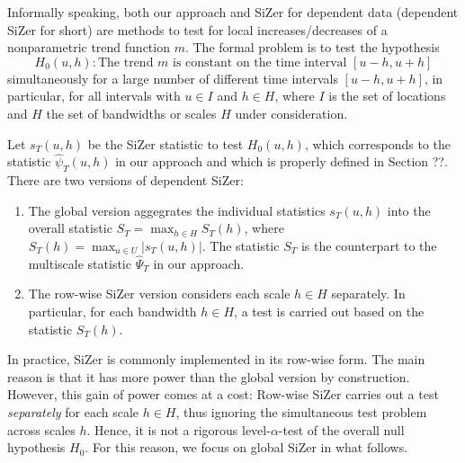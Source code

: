 \documentclass[a4paper,12pt]{article}
\begin{document}
Informally speaking, both our approach and SiZer for dependent data (dependent SiZer for short) are methods to test for local increases/decreases of a nonparametric trend function $m$. The formal problem is to test the hypothesis
\[ H_0(u,h): \text{The trend } m \text{ is constant on the time interval } [u-h,u+h] \]
simultaneously for a large number of different time intervals $[u-h,u+h]$, in particular, for all intervals with $u \in I$ and $h \in H$, where $I$ is the set of locations and $H$ the set of bandwidths or scales $H$ under consideration. 


Let $s_T(u,h)$ be the SiZer statistic to test $H_0(u,h)$, which corresponds to the statistic $\widehat{\psi}_T(u,h)$ in our approach and which is properly defined in Section ??. There are two versions of dependent SiZer: 
\begin{enumerate}[label=(\alph*), leftmargin=0.8cm]

\item The global version aggegrates the individual statistics $s_T(u,h)$ into the overall statistic $S_T = \max_{h \in H} S_T(h)$, where $S_T(h) = \max_{u \in U} |s_T(u,h)|$. The statistic $S_T$ is the counterpart to the multiscale statistic $\widehat{\Psi}_T$ in our approach. 

\item The row-wise SiZer version considers each scale $h \in H$ separately. In particular, for each bandwidth $h \in H$, a test is carried out based on the statistic $S_T(h)$. 

\end{enumerate}
In practice, SiZer is commonly implemented in its row-wise form. The main reason is that it has more power than the global version by construction. However, this gain of power comes at a cost: Row-wise SiZer carries out a test \textit{separately} for each scale $h \in H$, thus ignoring the simultaneous test problem across scales $h$. Hence, it is not a rigorous level-$\alpha$-test of the overall null hypothesis $H_0$. For this reason, we focus on global SiZer in what follows. 
\end{document}
